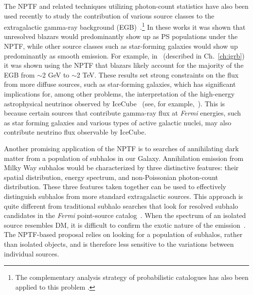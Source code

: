 The NPTF and related techniques utilizing photon-count statistics have also been used recently to study the contribution of various source classes to the extragalactic gamma-ray background (EGB)~\cite{Malyshev:2011zi,Zechlin:2015wdz,TheFermi-LAT:2015ykq,Zechlin:2016pme,Lisanti:2016jub}.\footnote{The complementary analysis strategy of probabilistic catalogues has also been applied to this problem \cite{Daylan:2016tia}.}  In these works it was shown that unresolved blazars would predominantly show up as PS populations under the NPTF, while other source classes such as star-forming galaxies would show up predominantly as smooth emission.  For example, in~\cite{Lisanti:2016jub} (described in Ch.~\ref{ch:igrb}) it was shown using the NPTF that blazars likely account for the majority of the EGB from $\sim$2 GeV to $\sim$2 TeV.  These results set strong constraints on the flux from more diffuse sources, such as star-forming galaxies, which has significant implications for, among other problems, the interpretation of the high-energy astrophysical neutrinos observed by IceCube~\cite{Aartsen:2013bka,Aartsen:2013jdh,Aartsen:2015knd,Aartsen:2015rwa} (see, for example,~\cite{Bechtol:2015uqb,Murase:2016gly}).  This is because certain sources that contribute gamma-ray flux at {\it Fermi} energies, such as star forming galaxies and various types of active galactic nuclei, may also contribute neutrino flux observable by IceCube.   

Another promising application of the NPTF is to searches of annihilating dark matter from a population of subhalos in our Galaxy. Annihilation emission from Milky Way subhalos would be characterized by three distinctive features: their spatial distribution, energy spectrum, and non-Poissonian photon-count distribution.  These three features taken together can be used to effectively distinguish subhalos from more standard extragalactic sources.  This approach is quite different from traditional subhalo searches that look for resolved subhalo candidates in the \emph{Fermi} point-source catalog~\cite{Calore:2016ogv,Hooper:2016cld,Schoonenberg:2016aml}.  When the spectrum of an isolated source resembles DM, it is difficult to confirm the exotic nature of the emission~\cite{Bertoni:2016hoh,Bertoni:2015mla}. The NPTF-based proposal relies on looking for a population of subhalos, rather than isolated objects, and is therefore less sensitive to the variations between individual sources.

